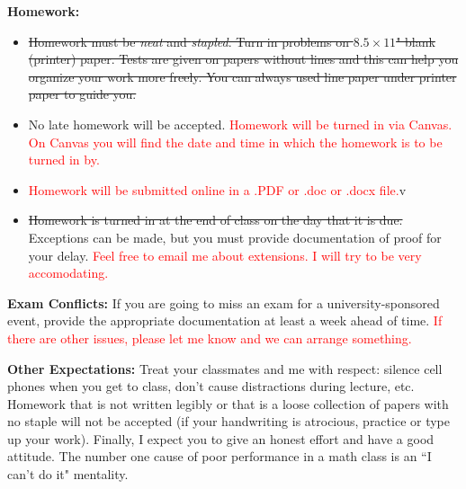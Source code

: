 \documentclass[12pt]{amsbook}
\begin{document}
\textbf{Homework:} 
\begin{itemize}
    \item \sout{Homework must be \emph{neat} and \emph{stapled}.  Turn in problems on $8.5\times 11$" blank (printer) paper.  Tests are given on papers without lines and this can help you organize your work more freely.  You can always used line paper under printer paper to guide you.}
    \item No late homework will be accepted.  \textcolor{red}{Homework will be turned in via Canvas. On Canvas you will find the date and time in which the homework is to be turned in by. }
    \item \textcolor{red}{Homework will be submitted online in a .PDF or .doc or .docx file.}v
    \item \sout{Homework is turned in at the end of class on the day that it is due.} Exceptions can be made, but you must provide documentation of proof for your delay. \textcolor{red}{Feel free to email me about extensions.  I will try to be very accomodating.}
    
\end{itemize}

\textbf{Exam Conflicts:} If you are going to miss an exam for a university-sponsored event, provide the appropriate documentation at least a week ahead of time. \textcolor{red}{If there are other issues, please let me know and we can arrange something.}

\textbf{Other Expectations:} Treat your classmates and me with respect: silence cell phones when you get to class, don't cause distractions during lecture, etc. Homework that is not written legibly or that is a loose collection of papers with no staple will not be accepted (if your handwriting is atrocious, practice or type up your work). Finally, I expect you to give an honest effort and have a good attitude. The number one cause of poor performance in a math class is an ``I can't do it" mentality.
\end{document}
